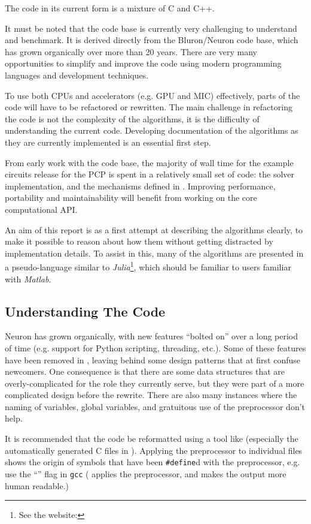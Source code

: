 The code in its current form is a mixture of C and C++.

It must be noted that the code base is currently very challenging to understand and benchmark. It is derived directly from the Bluron/Neuron code base, which has grown organically over more than 20 years. There are very many opportunities to simplify and improve the code using modern programming languages and development techniques.

To use both CPUs and accelerators (e.g. GPU and MIC) effectively, parts of the code will have to be refactored or rewritten. The main challenge in refactoring the code is not the complexity of the algorithms, it is the difficulty of understanding the current code. Developing documentation of the algorithms as they are currently implemented is an essential first step.

From early work with the code base, the majority of wall time for the example circuits release for the PCP is spent in a relatively small set of code: the  solver implementation, and the mechanisms defined in . Improving performance, portability and maintainability will benefit from working on the core computational API.

An aim of this report is as a first attempt at describing the algorithms clearly, to make it possible to reason about how them without getting distracted by implementation details. To assist in this, many of the algorithms are presented in a pseudo-language similar to \emph{Julia}\footnote{See the website: }, which should be familiar to users familiar with \emph{Matlab}.

\subsection{Understanding The Code}
Neuron has grown organically, with new features ``bolted on'' over a long period of time (e.g. support for Python scripting, threading, etc.).
Some of these features have been removed in \neuron, leaving behind some design patterns that at first confuse newcomers.
One consequence is that there are some data structures that are overly-complicated for the role they currently serve, but they were part of a more complicated design before the \neuron rewrite.
There are also many instances where the naming of variables, global variables, and gratuitous use of the preprocessor don't help.
\begin{note}
It is recommended that the code be reformatted using a tool like  (especially the automatically generated C files in ). Applying the preprocessor to individual files shows the origin of symbols that have been \texttt{\#define}d with the preprocessor, e.g. use the ``'' flag in \texttt{gcc} ( applies the preprocessor, and  makes the output more human readable.)
\end{note}

